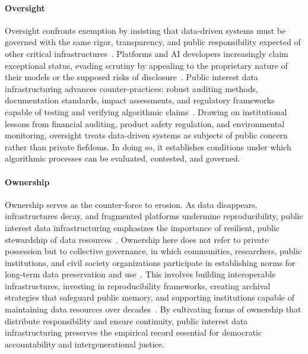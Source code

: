 \documentclass[acmsmall,screen]{acmart}
\begin{document}
\paragraph*{Oversight}
Oversight confronts exemption by insisting that data-driven systems must be governed with the same rigor, transparency, and public responsibility expected of other critical infrastructures~\cite{pasquale_black_2016,hutchinsonAccountabilityMachineLearning2021}. Platforms and AI developers increasingly claim exceptional status, evading scrutiny by appealing to the proprietary nature of their models or the supposed risks of disclosure~\cite{suzor2018digital,obar2020biggest}. Public interest data infrastructuring advances counter-practices: robust auditing methods, documentation standards, impact assessments, and regulatory frameworks capable of testing and verifying algorithmic claims~\cite{hutchinsonAccountabilityMachineLearning2021,selbst2019fairness}. Drawing on institutional lessons from financial auditing, product safety regulation, and environmental monitoring, oversight treats data-driven systems as subjects of public concern rather than private fiefdoms. In doing so, it establishes conditions under which algorithmic processes can be evaluated, contested, and governed.

\paragraph*{Ownership}
Ownership serves as the counter-force to erosion. As data disappears, infrastructures decay, and fragmented platforms undermine reproducibility, public interest data infrastructuring emphasizes the importance of resilient, public stewardship of data resources~\cite{Freelon_ComputationalResearchPostAPI_2018,gaffney_caveat_2018}. Ownership here does not refer to private possession but to collective governance, in which communities, researchers, public institutions, and civil society organizations participate in establishing norms for long-term data preservation and use~\cite{schwartz_archives_2002,stoler_ColonialArchivesArts_2002}. This involves building interoperable infrastructures, investing in reproducibility frameworks, creating archival strategies that safeguard public memory, and supporting institutions capable of maintaining data resources over decades~\cite{acker_DataCraftTheory_2019,Plantin_Infrastructurestudiesmeet_2016}. By cultivating forms of ownership that distribute responsibility and ensure continuity, public interest data infrastructuring preserves the empirical record essential for democratic accountability and intergenerational justice.
\end{document}

